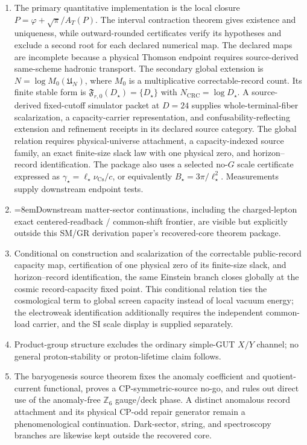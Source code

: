 \documentclass[11pt]{article}
\begin{document}
\begin{enumerate}[leftmargin=2em]
\item The primary quantitative implementation is the local closure \(P=\varphi+\sqrt\pi/A_T(P)\). The interval contraction theorem gives existence and uniqueness, while outward-rounded certificates verify its hypotheses and exclude a second root for each declared numerical map. The declared maps are incomplete because a physical Thomson endpoint requires source-derived same-scheme hadronic transport. The secondary global extension is \(N=\log M_0(\mathfrak U_N)\), where \(M_0\) is a multiplicative correctable-record count. Its finite stable form is \(\mathfrak F_{r,0}(D_\star)=\{D_\star\}\) with \(N_{\mathrm{CRC}}=\log D_\star\). A source-derived fixed-cutoff simulator packet at \(D=24\) supplies whole-terminal-fiber scalarization, a capacity-carrier representation, and confusability-reflecting extension and refinement receipts in its declared source category. The global relation requires physical-universe attachment, a capacity-indexed source family, an exact finite-size slack law with one physical zero, and horizon--record identification. The package also uses a selected no-\(G\) scale certificate expressed as \(\gamma_\star=\ell_\star\nu_{\mathrm{Cs}}/c\), or equivalently \(B_\star=3\pi/\ell_\star^2\). Measurements supply downstream endpoint tests.
\item {\emergencystretch=8em\relax Downstream matter-sector continuations, including the charged-lepton exact centered-readback / common-shift frontier, are visible but explicitly outside this SM/GR derivation paper's recovered-core theorem package.\par}
\item Conditional on construction and scalarization of the correctable public-record capacity map, certification of one physical zero of its finite-size slack, and horizon--record identification, the same Einstein branch closes globally at the cosmic record-capacity fixed point. This conditional relation ties the cosmological term to global screen capacity instead of local vacuum energy; the electroweak identification additionally requires the independent common-load carrier, and the SI scale display is supplied separately.
\item Product-group structure excludes the ordinary simple-GUT \(X/Y\) channel; no general proton-stability or proton-lifetime claim follows.
\item The baryogenesis source theorem fixes the anomaly coefficient and quotient-current functional, proves a CP-symmetric-source no-go, and rules out direct use of the anomaly-free \(\mathbb Z_6\) gauge/deck phase. A distinct anomalous record attachment and its physical CP-odd repair generator remain a phenomenological continuation. Dark-sector, string, and spectroscopy branches are likewise kept outside the recovered core.

\end{enumerate}
\end{document}
